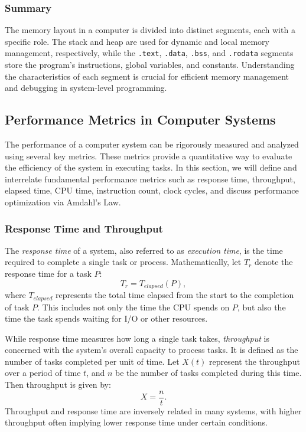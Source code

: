 \subsubsection{Summary}

The memory layout in a computer is divided into distinct segments, each with a specific role. The stack and heap are used for dynamic and local memory management, respectively, while the \texttt{.text}, \texttt{.data}, \texttt{.bss}, and \texttt{.rodata} segments store the program's instructions, global variables, and constants. Understanding the characteristics of each segment is crucial for efficient memory management and debugging in system-level programming.

\newpage

\subsection{Performance Metrics in Computer Systems}

The performance of a computer system can be rigorously measured and analyzed using several key metrics. These metrics provide a quantitative way to evaluate the efficiency of the system in executing tasks. In this section, we will define and interrelate fundamental performance metrics such as response time, throughput, elapsed time, CPU time, instruction count, clock cycles, and discuss performance optimization via Amdahl’s Law.

\subsubsection{Response Time and Throughput}

The \emph{response time} of a system, also referred to as \emph{execution time}, is the time required to complete a single task or process. Mathematically, let $T_r$ denote the response time for a task $P$:
\[
T_r = T_{elapsed}(P),
\]
where $T_{elapsed}$ represents the total time elapsed from the start to the completion of task $P$. This includes not only the time the CPU spends on $P$, but also the time the task spends waiting for I/O or other resources.

While response time measures how long a single task takes, \emph{throughput} is concerned with the system's overall capacity to process tasks. It is defined as the number of tasks completed per unit of time. Let $X(t)$ represent the throughput over a period of time $t$, and $n$ be the number of tasks completed during this time. Then throughput is given by:
\[
X = \frac{n}{t}.
\]
Throughput and response time are inversely related in many systems, with higher throughput often implying lower response time under certain conditions.

